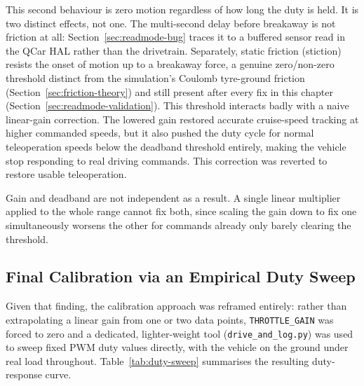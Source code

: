 This second behaviour is zero motion regardless of how long the duty
is held. It is two distinct effects, not one. The multi-second delay
before breakaway is not friction at all: Section~\ref{sec:readmode-bug}
traces it to a buffered sensor read in the QCar HAL rather than the
drivetrain. Separately, static friction (stiction) resists the onset
of motion up to a breakaway force, a genuine zero/non-zero threshold
distinct from the simulation's Coulomb tyre-ground friction
(Section~\ref{sec:friction-theory}) and still present after every fix
in this chapter (Section~\ref{sec:readmode-validation}). This
threshold interacts badly with a naive linear-gain correction. The
lowered gain restored accurate cruise-speed tracking at higher
commanded speeds, but it also pushed the duty cycle for normal
teleoperation speeds below the deadband threshold entirely, making
the vehicle stop responding to real driving commands. This correction
was reverted to restore usable teleoperation.

Gain and deadband are not independent as a result. A single linear
multiplier applied to the whole range cannot fix both, since scaling
the gain down to fix one simultaneously worsens the other for
commands already only barely clearing the threshold.

\subsection{Final Calibration via an Empirical Duty Sweep}
\label{sec:final-calibration}

Given that finding, the calibration approach was reframed entirely:
rather than extrapolating a linear gain from one or two data points,
\texttt{THROTTLE\_GAIN} was forced to zero and a dedicated,
lighter-weight tool (\texttt{drive\_and\_log.py}) was used to sweep
fixed PWM duty values directly, with the vehicle on the ground under
real load throughout. Table~\ref{tab:duty-sweep} summarises the
resulting duty-response curve.

